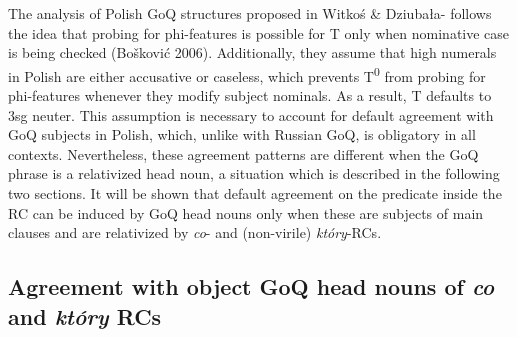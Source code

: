\documentclass[output=paper]{langsci/langscibook}
\begin{document}
The analysis of Polish GoQ structures proposed in Witkoś \& Dziubała-\citet{Szrejbrowska2016} follows the idea that probing for phi-features is possible for T only when nominative case is being checked (Bošković 2006). Additionally, they assume that high numerals in Polish are either accusative or caseless, which prevents T\textsuperscript{0} from probing for phi-features whenever they modify subject nominals. As a result, T defaults to 3sg neuter. This assumption is necessary to account for default agreement with GoQ subjects in Polish, which, unlike with Russian GoQ, is obligatory in all contexts. Nevertheless, these agreement patterns are different when the GoQ phrase is a relativized head noun, a situation which is described in the following two sections. It will be shown that default agreement on the predicate inside the RC can be induced by GoQ head nouns only when these are subjects of main clauses and are relativized by \textit{co}{}- and (non-virile) \textit{który}{}-RCs.

\subsection{Agreement with object GoQ head nouns of \textit{co} and \textit{który} RCs}%
 
\end{document}
